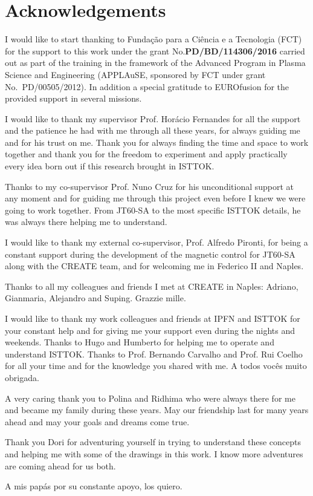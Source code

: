 \chapter*{Acknowledgements}

I would like to start thanking to Funda\c{c}\~{a}o para a Ci\^{e}ncia e a Tecnologia (FCT) for the support to this work under the grant No.\textbf{PD/BD/114306/2016} carried out as part of the training in the framework of the Advanced Program in Plasma Science and Engineering (APPLAuSE, sponsored by FCT under grant No.~PD/00505/2012). In addition a special gratitude to EUROfusion for the provided support in several missions. 
\smallskip

I would like to thank my supervisor Prof. Horácio Fernandes for all the support and the patience he had with me through all these years, for always guiding me and for his trust on me. Thank you for always finding the time and space to work together and thank you for the  freedom to experiment and apply practically every idea born out if this research brought in ISTTOK.
\smallskip

Thanks to my co-supervisor Prof. Nuno Cruz for his unconditional support at any moment and for guiding me through this project even before I knew we were going to work together. From JT60-SA to the most specific ISTTOK details, he was always there helping me to understand.
\smallskip

I would like to thank my external co-supervisor, Prof. Alfredo Pironti, for being a constant support during the development of the magnetic control for JT60-SA along with the CREATE team, and for welcoming me in Federico II and Naples. \smallskip

Thanks to all my colleagues and friends I met at CREATE in Naples: Adriano, Gianmaria, Alejandro and Suping. Grazzie mille.\smallskip

I would like to thank my work colleagues and friends at IPFN and ISTTOK for your constant help and for giving me your support even during the nights and weekends. Thanks to Hugo and Humberto for helping me to operate and understand ISTTOK. Thanks to Prof. Bernando Carvalho and Prof. Rui Coelho for all your time and for the knowledge you shared with me. A todos vocês muito obrigada.\smallskip


A very caring thank you to Polina and Ridhima who were always there for me and became my family during these years. May our friendship last for many years ahead and may your goals and dreams come true.\smallskip

Thank you Dori for adventuring yourself in trying to understand these concepts and helping me with some of the drawings in this work. I know more adventures are coming ahead for us both.\smallskip

A mis papás por su constante apoyo, los quiero.   

 





